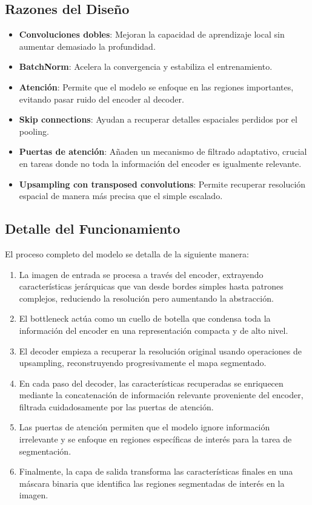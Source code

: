 \subsection*{Razones del Diseño}
\begin{itemize}
    \item \textbf{Convoluciones dobles}: Mejoran la capacidad de aprendizaje local sin aumentar demasiado la profundidad.
    \item \textbf{BatchNorm}: Acelera la convergencia y estabiliza el entrenamiento.
    \item \textbf{Atención}: Permite que el modelo se enfoque en las regiones importantes, evitando pasar ruido del encoder al decoder.
    \item \textbf{Skip connections}: Ayudan a recuperar detalles espaciales perdidos por el pooling.
    \item \textbf{Puertas de atención}: Añaden un mecanismo de filtrado adaptativo, crucial en tareas donde no toda la información del encoder es igualmente relevante.
    \item \textbf{Upsampling con transposed convolutions}: Permite recuperar resolución espacial de manera más precisa que el simple escalado.
\end{itemize}

\subsection*{Detalle del Funcionamiento}
El proceso completo del modelo se detalla de la siguiente manera:
\begin{enumerate}
\item La imagen de entrada se procesa a través del encoder, extrayendo características jerárquicas que van desde bordes simples hasta patrones complejos, reduciendo la resolución pero aumentando la abstracción.
\item El bottleneck actúa como un cuello de botella que condensa toda la información del encoder en una representación compacta y de alto nivel.
\item El decoder empieza a recuperar la resolución original usando operaciones de upsampling, reconstruyendo progresivamente el mapa segmentado.
\item En cada paso del decoder, las características recuperadas se enriquecen mediante la concatenación de información relevante proveniente del encoder, filtrada cuidadosamente por las puertas de atención.
\item Las puertas de atención permiten que el modelo ignore información irrelevante y se enfoque en regiones específicas de interés para la tarea de segmentación.
\item Finalmente, la capa de salida transforma las características finales en una máscara binaria que identifica las regiones segmentadas de interés en la imagen.
\end{enumerate}

